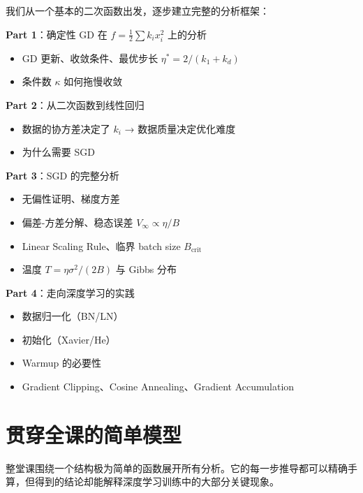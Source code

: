 \documentclass[12pt, a4paper]{ctexart}
\begin{document}
\begin{blackboard}[本节课的路线图]

我们从一个基本的二次函数出发，逐步建立完整的分析框架：

\textbf{Part 1}：确定性 GD 在 $f = \frac{1}{2}\sum k_i x_i^2$ 上的分析
\begin{itemize}
    \item GD 更新、收敛条件、最优步长 $\eta^* = 2/(k_1+k_d)$
    \item 条件数 $\kappa$ 如何拖慢收敛
\end{itemize}

\textbf{Part 2}：从二次函数到线性回归
\begin{itemize}
    \item 数据的协方差决定了 $k_i$ → 数据质量决定优化难度
    \item 为什么需要 SGD
\end{itemize}

\textbf{Part 3}：SGD 的完整分析
\begin{itemize}
    \item 无偏性证明、梯度方差
    \item 偏差-方差分解、稳态误差 $V_\infty \propto \eta/B$
    \item Linear Scaling Rule、临界 batch size $B_{\text{crit}}$
    \item 温度 $T = \eta\sigma^2/(2B)$ 与 Gibbs 分布
\end{itemize}

\textbf{Part 4}：走向深度学习的实践
\begin{itemize}
    \item 数据归一化（BN/LN）
    \item 初始化（Xavier/He）
    \item Warmup 的必要性
    \item Gradient Clipping、Cosine Annealing、Gradient Accumulation
\end{itemize}

\end{blackboard}


\section{贯穿全课的简单模型}

整堂课围绕一个结构极为简单的函数展开所有分析。它的每一步推导都可以精确手算，但得到的结论却能解释深度学习训练中的大部分关键现象。
\end{document}
